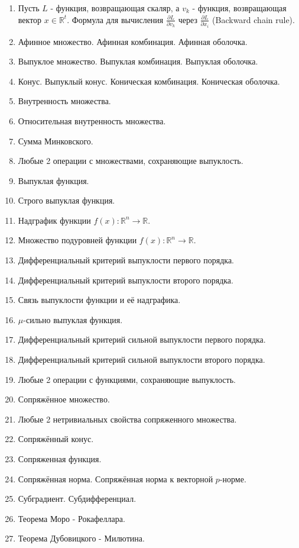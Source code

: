 \documentclass[11pt]{article}
\newcommand{\R}{\mathbb{R}}
\begin{document}
\begin{enumerate}
    \item Пусть $L$ - функция, возвращающая скаляр, а $v_k$ - функция, возвращающая вектор $x \in \R^t$. Формула для вычисления $\frac{\partial L}{\partial v_k}$ через $\frac{\partial L}{\partial x_i}$ (Backward chain rule).
    \item Афинное множество. Афинная комбинация. Афинная оболочка.
    \item Выпуклое множество. Выпуклая комбинация. Выпуклая оболочка.
    \item Конус. Выпуклый конус. Коническая комбинация. Коническая оболочка.
    \item Внутренность множества. 
    \item Относительная внутренность множества.
    \item Сумма Минковского.
    \item Любые 2 операции с множествами, сохраняющие выпуклость.
    \item Выпуклая функция.
    \item Строго выпуклая функция.
    \item Надграфик функции $f(x): \R^n \to \R$.
    \item Множество подуровней функции $f(x): \R^n \to \R$.
    \item Дифференциальный критерий выпуклости первого порядка.
    \item Дифференциальный критерий выпуклости второго порядка.
    \item Связь выпуклости функции и её надграфика.
    \item $\mu$-сильно выпуклая функция.
    \item Дифференциальный критерий сильной выпуклости первого порядка.
    \item Дифференциальный критерий сильной выпуклости второго порядка.
    \item Любые 2 операции с функциями, сохраняющие выпуклость.
    \item Сопряжённое множество.
    \item Любые 2 нетривиальных свойства сопряженного множества.
    \item Сопряжённый конус.
    \item Сопряженная функция.
    \item Сопряжённая норма. Сопряжённая норма к векторной $p$-норме.
    \item Субградиент. Субдифференциал.
    \item Теорема Моро - Рокафеллара.
    \item Теорема Дубовицкого - Милютина.

\end{enumerate}
\end{document}

